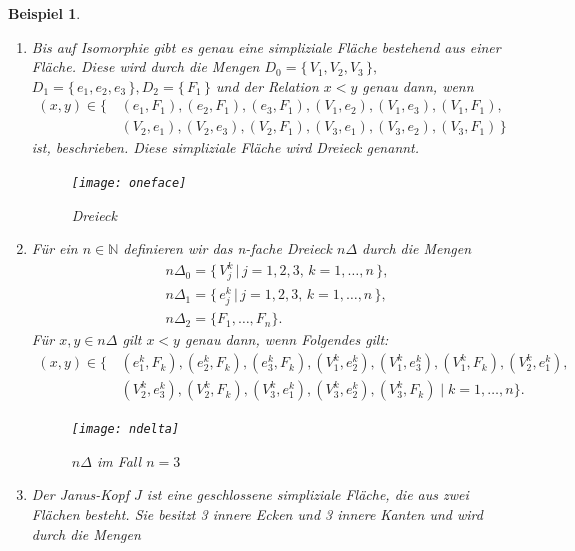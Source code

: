 \documentclass[12pt,titlepage,twoside,cleardoublepage]{article}
\theoremstyle{nummermitklammern}
\newtheorem{bsp}[temp]{Beispiel}
\newtheorem{bsp}[zahl]{Beispiel}
\numberwithin{equation}{section}
\begin{document}
 \begin{bsp}\label{bspsimp}
 \begin{enumerate}
\item 
 Bis auf Isomorphie gibt es genau eine simpliziale Fläche bestehend aus einer Fläche. Diese wird durch die Mengen $
D_{0}=\{\,V_{1},V_{2},V_{3}\,\},$  $D_{1}=\{\,e_{1},e_{2},e_{3}\,\}, D_{2}=\{\,F_{1}\,\}$  und der Relation $x<y$ genau dann, wenn
\begin{align*}
 (x,y)\in \{\,&(e_{1},F_{1}),(e_{2},F_{1}),(e_{3},F_{1}),(V_{1},e_{2}),(V_{1},e_{3}),(V_{1},F_{1}),\\ &(V_{2},e_{1}), (V_{2},e_{3}),(V_{2},F_{1}),
 (V_{3},e_{1}),(V_{3},e_{2}),(V_{3},F_{1})\,\} 
\end{align*} 
ist, beschrieben. Diese simpliziale Fläche wird \emph{Dreieck} genannt. 
\begin{figure}[H]
\begin{center}
\texttt{[image: oneface]}
\end{center}
\caption{Dreieck}
\end{figure}
 \item
 Für ein $n \in \mathbb{N}$ definieren wir das \emph{n-fache Dreieck} $n \Delta$ durch die Mengen 
 \begin{align*}
  &n\Delta_0=\{ \,V_{j}^{k}\,\vert\, j=1,2,3,\,k=1,\ldots,n\,\},\\
   &n\Delta_1=\{\,e_{j}^{k}\,\vert\, j=1,2,3,\,k=1,\ldots,n\,\},\\
   &n\Delta_2=\{F_{1},\ldots,F_{n}\} .
   \end{align*}
   Für $x,y\in n\Delta$ gilt $x<y$ genau dann, wenn Folgendes gilt:
   \begin{align*}
 (x,y)\in \{\,&(e_{1}^k,F_{k}),(e_{2}^k,F_{k}),(e_{3}^k,F_{k}),(V_{1}^k,e_{2}^k),(V_{1}^k,e_{3}^k),(V_{1}^k,F_{k}), (V_{2}^k,e_{1}^k),\\ &(V_{2}^k,e_{3}^k),(V_{2}^k,F_{k}),(V_{3}^k,e_{1}^k),(V_{3}^k,e_{2}^k),(V_{3}^k,F_{k})\mid k=1,\ldots,n\} .
\end{align*}
 \begin{figure}[H]
\begin{center}
\texttt{[image: ndelta]}
\end{center}
\caption{$n\Delta$ im Fall $n=3$}
\end{figure}
 \item 
 Der \emph{Janus-Kopf} $J$ ist eine geschlossene simpliziale Fläche, die aus zwei Flächen besteht. Sie besitzt 3 innere Ecken und 3 innere Kanten und wird durch die Mengen

\end{enumerate}
\end{bsp}
\end{document}
